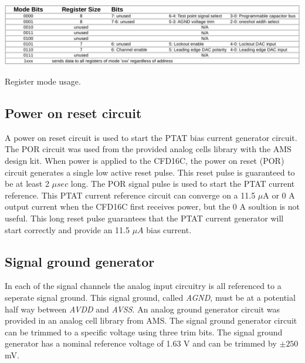 \documentclass[12pt,oneside,final]{siuethesis}
\theoremstyle{definition}
\begin{document}
\begin{table}[htbp!]
 \centering
 \includegraphics[scale=.3,keepaspectratio=true]{../data/modes.png}
 \caption{Register mode usage.}
 \label{tab:registers}
\end{table}


\subsection{Power on reset circuit}
\par A power on reset circuit is used to start the PTAT bias current generator circuit. The POR circuit was used from the provided analog cells library with the AMS design kit. When power is applied to the CFD16C, the power on reset (POR) circuit generates a single low active reset pulse. This reset pulse is guaranteed to be at least 2 $\mu sec$ long. The POR signal pulse is used to start the PTAT current reference. This PTAT current reference circuit can converge on a 11.5 $\mu$A or 0 A output current when the CFD16C first receives power, but the 0 A soultion is not useful. This long reset pulse guarantees that the PTAT current generator will start correctly and provide an 11.5 $\mu A$ bias current.

\subsection{Signal ground generator}
\par In each of the signal channels the analog input circuitry is all referenced to a seperate signal ground. This signal ground, called \emph{AGND}, must be at a potential half way between \emph{AVDD} and \emph{AVSS}. An analog ground generator circuit was provided in an analog cell library from AMS. The signal ground generator circuit can be trimmed to a specific voltage using three trim bits. The signal ground generator has a nominal reference voltage of 1.63 V and can be trimmed by $\pm 250$ mV.
\end{document}
